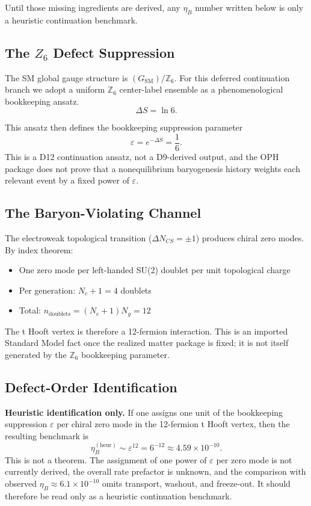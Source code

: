 Until those missing ingredients are derived, any \(\eta_B\) number written below is only a heuristic continuation benchmark.

\subsection{\texorpdfstring{The \(Z_6\) Defect Suppression}{The Z6 Defect Suppression}}\label{111-the-zux2086-defect-suppression}

The SM global gauge structure is \((G_{\text{SM}})/\mathbb{Z}_6\). For this deferred continuation branch we adopt a uniform \(\mathbb{Z}_6\) center-label ensemble as a phenomenological bookkeeping ansatz.
\[
\Delta S = \ln 6.
\]

This ansatz then defines the bookkeeping suppression parameter
\[
\varepsilon = e^{-\Delta S} = \frac{1}{6}.
\]
This is a D12 continuation ansatz, not a D9-derived output, and the OPH package does not prove that a nonequilibrium baryogenesis history weights each relevant event by a fixed power of \(\varepsilon\).

\subsection{The Baryon-Violating Channel}\label{112-the-baryon-violating-channel}

The electroweak topological transition (\(\Delta N_{CS} = \pm 1\)) produces chiral zero modes. By index theorem:

\begin{itemize}
\tightlist
\item
 One zero mode per left-handed SU(2) doublet per unit topological charge
\item
 Per generation: \(N_c + 1 = 4\) doublets
\item
 Total: \(n_{\text{doublets}} = (N_c + 1)N_g = 12\)
\end{itemize}

The \textquotesingle t Hooft vertex is therefore a 12-fermion interaction. This is an imported Standard Model fact once the realized matter package is fixed; it is not itself generated by the \(\mathbb{Z}_6\) bookkeeping parameter.

\subsection{Defect-Order Identification}\label{113-defect-order-identification}

\textbf{Heuristic identification only.} If one assigns one unit of the bookkeeping suppression \(\varepsilon\) per chiral zero mode in the 12-fermion \textquotesingle t Hooft vertex, then the resulting benchmark is
\[
\eta_B^{(\mathrm{heur})} \sim \varepsilon^{12} = 6^{-12} \approx 4.59 \times 10^{-10}.
\]
This is not a theorem. The assignment of one power of \(\varepsilon\) per zero mode is not currently derived, the overall rate prefactor is unknown, and the comparison with observed \(\eta_B \approx 6.1 \times 10^{-10}\) omits transport, washout, and freeze-out. It should therefore be read only as a heuristic continuation benchmark.

